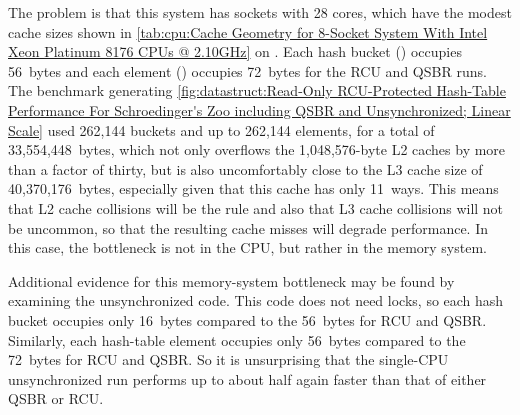 The problem is that this system has sockets with 28 cores, which have
the modest cache sizes shown in
\cref{tab:cpu:Cache Geometry for 8-Socket System With Intel Xeon Platinum 8176 CPUs @ 2.10GHz}
on .
Each hash bucket () occupies 56~bytes and each
element () occupies 72~bytes for the RCU and QSBR runs.
The benchmark generating
\cref{fig:datastruct:Read-Only RCU-Protected Hash-Table Performance For Schroedinger's Zoo including QSBR and Unsynchronized; Linear Scale}
used 262,144 buckets and up to 262,144 elements, for a total of
33,554,448~bytes, which not only overflows the 1,048,576-byte L2 caches
by more than a factor of thirty, but is also uncomfortably close to the
L3 cache size of 40,370,176~bytes, especially given that this cache has
only 11~ways.
This means that L2 cache collisions will be the rule and also that L3
cache collisions will not be uncommon, so that the resulting cache misses
will degrade performance.
In this case, the bottleneck is not in the CPU, but rather in the
memory system.

Additional evidence for this memory-system bottleneck may be found by
examining the unsynchronized code.
This code does not need locks, so each hash bucket occupies only 16~bytes
compared to the 56~bytes for RCU and QSBR\@.
Similarly, each hash-table element occupies only 56~bytes compared to the
72~bytes for RCU and QSBR\@.
So it is unsurprising that the single-CPU unsynchronized run performs up
to about half again faster than that of either QSBR or RCU\@.

